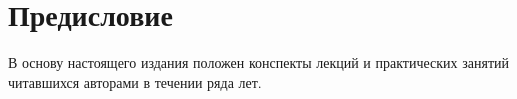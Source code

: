\chapter*{Предисловие}
\chaptermark{}
В основу настоящего издания положен конспекты лекций и практических занятий читавшихся авторами в течении ряда лет.